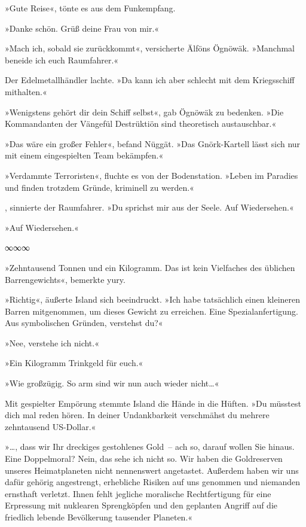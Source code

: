 »Gute Reise«, tönte es aus dem Funkempfang.

»Danke schön. Grüß deine Frau von mir.«

»Mach ich, sobald sie zurückkommt«, versicherte Älföns Ögnöwäk. »Manchmal beneide ich euch Raumfahrer.«

Der Edelmetallhändler lachte. »Da kann ich aber schlecht mit dem Kriegsschiff mithalten.«

»Wenigstens gehört dir dein Schiff selbst«, gab Ögnöwäk zu bedenken. »Die Kommandanten der Vängefül Destrüktiön sind theoretisch austauschbar.«

»Das wäre ein großer Fehler«, befand Nüggät. »Das Gnörk-Kartell lässt sich nur mit einem eingespielten Team bekämpfen.«

»Verdammte Terroristen«, fluchte es von der Bodenstation. »Leben im Paradies und finden trotzdem Gründe, kriminell zu werden.«

, sinnierte der Raumfahrer. »Du sprichst mir aus der Seele. Auf Wiedersehen.« 

»Auf Wiedersehen.«

\begin{center}
∞∞∞
\end{center}

»Zehntausend Tonnen und ein Kilogramm. Das ist kein Vielfaches des üblichen Barrengewichts«, bemerkte yury.

»Richtig«, äußerte Island sich beeindruckt. »Ich habe tatsächlich einen kleineren Barren mitgenommen, um dieses Gewicht zu erreichen. Eine Spezialanfertigung. Aus symbolischen Gründen, verstehst du?«

»Nee, verstehe ich nicht.«

»Ein Kilogramm Trinkgeld für euch.«

»Wie großzügig. So arm sind wir nun auch wieder nicht…«

Mit gespielter Empörung stemmte Island die Hände in die Hüften. »Du müsstest dich mal reden hören. In deiner Undankbarkeit verschmähst du mehrere zehntausend US-Dollar.«

»…, dass wir Ihr dreckiges gestohlenes Gold~– ach so, darauf wollen Sie hinaus. Eine Doppelmoral? Nein, das sehe ich nicht so. Wir haben die Goldreserven unseres Heimatplaneten nicht nennenswert angetastet. Außerdem haben wir uns dafür gehörig angestrengt, erhebliche Risiken auf uns genommen und niemanden ernsthaft verletzt. Ihnen fehlt jegliche moralische Rechtfertigung für eine Erpressung mit nuklearen Sprengköpfen und den geplanten Angriff auf die friedlich lebende Bevölkerung tausender Planeten.«

